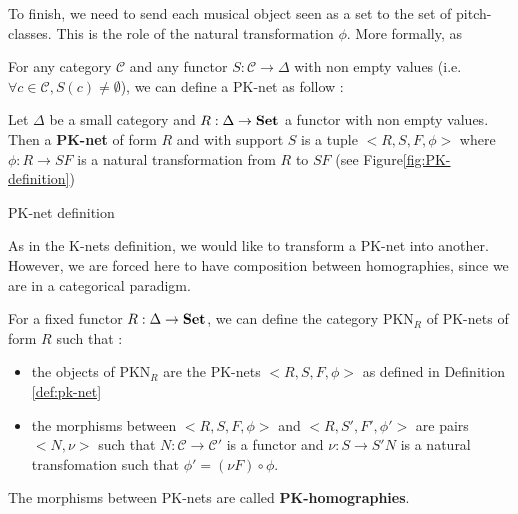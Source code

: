 To finish, we need to send each musical object seen as a set to the set of pitch-classes. This is the role of the natural transformation $\phi$. More formally,  as 

\begin{defn}
    \label{def:pk-net}
    For any category $\mathcal{C}$ and any functor $S:\mathcal{C} \rightarrow \Delta$ with non empty values (i.e. $\forall c \in \mathcal{C}, S(c) \neq \emptyset$), we can define a PK-net as follow : 

    Let $\Delta$ be a small category and $R : \Delta \rightarrow \bf Set$ a functor with non empty values. Then a \textbf{PK-net} of form $R$ and with support $S$ is a tuple $\big<R,S,F,\phi\big>$ where $\phi : R \rightarrow SF$ is a natural transformation from $R$ to $SF$ (see Figure\ref{fig:PK-definition})

    \begin{tzcategory}{\caption{PK-net definition}
        \label{fig:PK-definition}}
    \end{tzcategory}

\end{defn}

As in the K-nets definition, we would like to transform a PK-net into another. However, we are forced here to have composition between homographies, since we are in a categorical paradigm.

\begin{defn}
    For a fixed functor $R: \Delta \rightarrow \bf Set$, we can define the category $ \text{PKN}_R$ of PK-nets of form $R$ such that : 
    \begin{itemize}
        \item the objects of $\text{PKN}_R$\label{nomencl:PKNR} are the PK-nets $\big<R,S,F,\phi\big>$ as defined in Definition \ref{def:pk-net}
        \item the morphisms between $\big<R,S,F,\phi\big>$ and $\big<R,S',F',\phi'\big>$ are pairs $\big< N,\nu\big>$ such that $N : \mathcal{C} \rightarrow \mathcal{C}'$ is a functor and $\nu : S \rightarrow S'N$ is a natural transfomation such that $\phi' = (\nu F)\circ \phi$.
    \end{itemize}
\end{defn}

\begin{note}
    The morphisms between PK-nets are called \textbf{PK-homographies}. 
\end{note}


